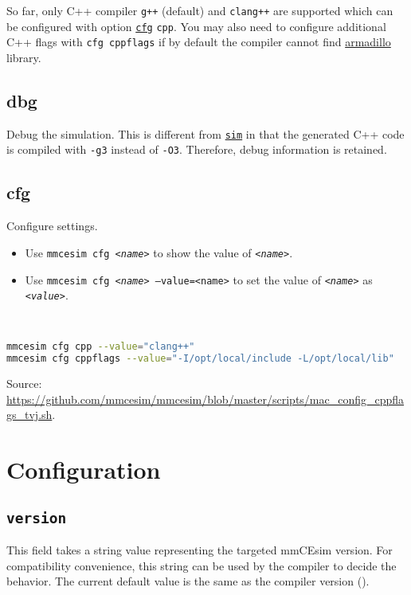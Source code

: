 So far, only C++ compiler \texttt{g++} (default) and \texttt{clang++} are supported which can be configured with option \hyperref[d:subsec:cfg]{\texttt{cfg}} \texttt{cpp}.
You may also need to configure additional C++ flags with \texttt{cfg cppflags} if by default the compiler cannot find
\href{https://arma.sourceforge.net/}{armadillo}
library.

\subsection{dbg}
Debug the simulation.
This is different from \hyperref[d:subsec:sim]{\texttt{sim}} in that the generated C++ code is compiled with \texttt{-g3} instead of \texttt{-O3}.
Therefore, debug information is retained.


\subsection{cfg}\label{d:subsec:cfg}
Configure settings.

\begin{itemize}
  \item Use \texttt{mmcesim cfg \textit{<name>}} to show the value of \texttt{\textit{<name>}}.
  \item Use \texttt{mmcesim cfg \textit{<name>} --value=\texttt{<name>}} to set the value of \texttt{\textit{<name>}} as \texttt{\textit{<value>}}.
\end{itemize}

\begin{example}[Configure C++]~
  \begin{lstlisting}[language=sh]
mmcesim cfg cpp --value="clang++"
mmcesim cfg cppflags --value="-I/opt/local/include -L/opt/local/lib"
  \end{lstlisting}
  {\small Source: \url{https://github.com/mmcesim/mmcesim/blob/master/scripts/mac_config_cppflags_tvj.sh}.}
\end{example}

\section{Configuration}

\subsection{\texttt{version}}
This field takes a string value representing the targeted mmCEsim version.
For compatibility convenience, this string can be used by the compiler
to decide the behavior.
The current default value is the same as the compiler version (\texttt{\mmCEsimVersion}).

